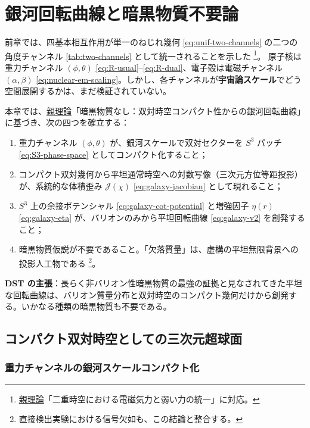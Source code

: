 \documentclass[dvipdfmx,a4paper,oneside]{jsbook}
\numberwithin{equation}{chapter}
\begin{document}
\chapter{銀河回転曲線と暗黒物質不要論}

前章では、四基本相互作用が単一のねじれ幾何 \eqref{eq:unif-two-channels} の二つの角度チャンネル \eqref{tab:two-channels} として統一されることを示した \footnote{\hyperref[sec:sister-manuscripts]{親理論}「二重時空における電磁気力と弱い力の統一」に対応。}。
原子核は重力チャンネル \((\phi, \theta)\) \eqref{eq:R-usual}–\eqref{eq:R-dual}、電子殻は電磁チャンネル \((\alpha, \beta)\) \eqref{eq:nuclear-em-scaling}。しかし、各チャンネルが\textbf{宇宙論スケール}でどう空間展開するかは、まだ検証されていない。

本章では、\hyperref[sec:sister-manuscripts]{親理論}「暗黒物質なし：双対時空コンパクト性からの銀河回転曲線」 に基づき、次の四つを確立する：
\begin{enumerate}[leftmargin=2em]
  \item 重力チャンネル \((\phi, \theta)\) が、銀河スケールで双対セクターを \(S^3\) パッチ \eqref{eq:S3-phase-space} としてコンパクト化すること；
  \item コンパクト双対幾何から平坦通常時空への対数写像（三次元方位等距投影）が、系統的な体積歪み \(\mathcal{J}(\chi)\) \eqref{eq:galaxy-jacobian} として現れること；
  \item \(S^3\) 上の余接ポテンシャル \eqref{eq:galaxy-cot-potential} と増強因子 \(\eta(r)\) \eqref{eq:galaxy-eta} が、バリオンのみから平坦回転曲線 \eqref{eq:galaxy-v2} を創発すること；
  \item 暗黒物質仮説が不要であること。「欠落質量」は、虚構の平坦無限背景への投影人工物である \footnote{直接検出実験における信号欠如も、この結論と整合する。}。
\end{enumerate}

\textbf{DST の主張}：長らく非バリオン性暗黒物質の最強の証拠と見なされてきた平坦な回転曲線は、バリオン質量分布と双対時空のコンパクト幾何だけから創発する。いかなる種類の暗黒物質も不要である。

\section{コンパクト双対時空としての三次元超球面}

\subsection{重力チャンネルの銀河スケールコンパクト化}
\end{document}
